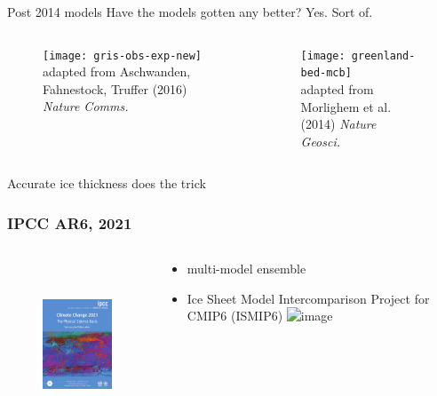 \documentclass[hide notes,intlimits]{beamer}
\begin{document}
\begin{frame}{Post 2014 models}
  \alert{Have the models gotten any better? Yes. Sort of.}
  \begin{columns}[c]
    \begin{column}{.6\linewidth}
    \begin{figure}
      \texttt{[image: gris-obs-exp-new]}
      \\ \tiny{adapted from Aschwanden, Fahnestock, Truffer (2016) \textit{Nature Comms.}}
    \end{figure}
    \end{column}
    \begin{column}{.4\linewidth}
      \begin{figure}
        \texttt{[image: greenland-bed-mcb]}
      \\ \tiny{adapted from Morlighem et al. (2014) \textit{Nature Geosci.}}
      \end{figure}
    \end{column}
  \end{columns}
  \alert{Accurate ice thickness does the trick}
  
\end{frame}


\begin{frame}
  \frametitle{IPCC AR6, 2021}
  \begin{columns}[c]
    \begin{column}{.4\linewidth}
      \begin{figure}
        \includegraphics[height=5cm]{ar6-wg1}
      \end{figure}
    \end{column}
    \begin{column}{.6\linewidth}
      \begin{itemize}
      \item multi-model ensemble
      \item Ice Sheet Model Intercomparison Project for CMIP6 (ISMIP6)
        \includegraphics<1>[width=2cm]{ismip6_logo}
      \end{itemize}
    \end{column}
  \end{columns}
\end{frame}
\end{document}
